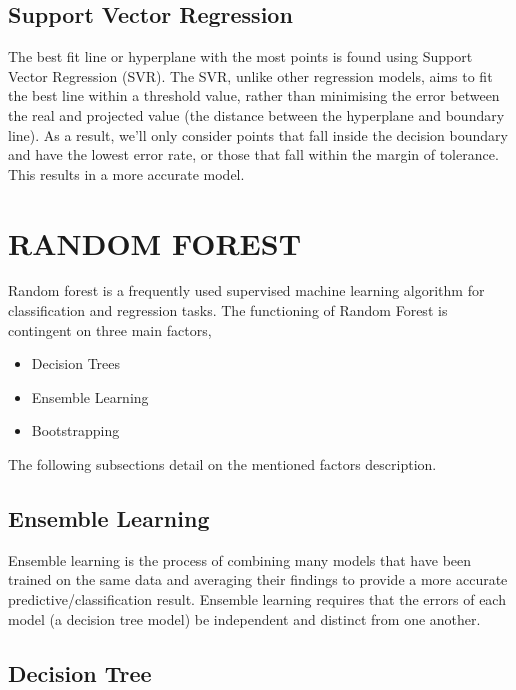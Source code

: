 \subsection{Support Vector Regression}

The best fit line or hyperplane with the most points is found using Support Vector Regression (SVR). The SVR, unlike other regression models, aims to fit the best line within a threshold value, rather than minimising the error between the real and projected value (the distance between the hyperplane and boundary line). As a result, we'll only consider points that fall inside the decision boundary and have the lowest error rate, or those that fall within the margin of tolerance. This results in a more accurate model.


\section{RANDOM FOREST}

Random forest is a frequently used supervised machine learning algorithm for classification and regression tasks. The functioning of
Random Forest is contingent on three main factors,
\begin{itemize}
\item Decision Trees
\item Ensemble Learning
\item Bootstrapping
\end{itemize}

The following subsections %
detail on the mentioned factors description.

\subsection{Ensemble Learning}

Ensemble learning is the process of combining many models that have been trained on the same data and averaging their findings to provide a more accurate predictive/classification result. Ensemble learning requires that the errors of each model (a decision tree model) be independent and distinct from one another.

\subsection{Decision Tree}

